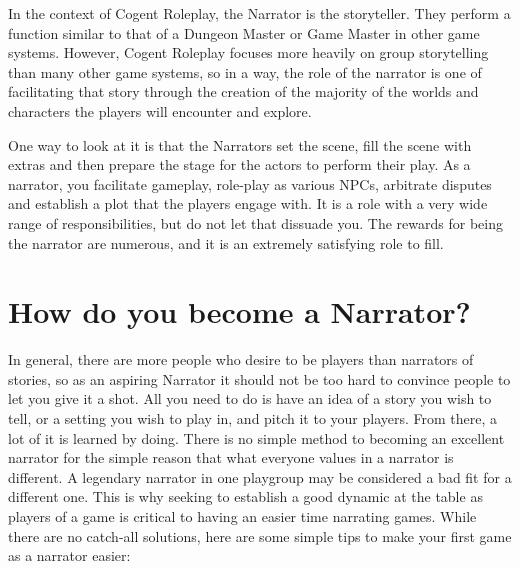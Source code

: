 In the context of Cogent Roleplay, the Narrator is the storyteller. They perform a function similar to that of a Dungeon Master or Game Master in other game systems. However, Cogent Roleplay focuses more heavily on group storytelling than many other game systems, so in a way, the role of the narrator is one of facilitating that story through the creation of the majority of the worlds and characters the players will encounter and explore.

One way to look at it is that the Narrators set the scene, fill the scene with extras and then prepare the stage for the actors to perform their play. As a narrator, you facilitate gameplay, role-play as various NPCs, arbitrate disputes and establish a plot that the players engage with. It is a role with a very wide range of responsibilities, but do not let that dissuade you. The rewards for being the narrator are numerous, and it is an extremely satisfying role to fill.

\section{How do you become a Narrator?}

In general, there are more people who desire to be players than narrators of stories, so as an aspiring Narrator it should not be too hard to convince people to let you give it a shot. All you need to do is have an idea of a story you wish to tell, or a setting you wish to play in, and pitch it to your players. From there, a lot of it is learned by doing. There is no simple method to becoming an excellent narrator for the simple reason that what everyone values in a narrator is different. A legendary narrator in one playgroup may be considered a bad fit for a different one. This is why seeking to establish a good dynamic at the table as players of a game is critical to having an easier time narrating games. While there are no catch-all solutions, here are some simple tips to make your first game as a narrator easier:

